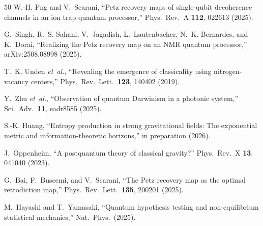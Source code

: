 \documentclass[prl,twocolumn,superscriptaddress,longbibliography,floatfix]{revtex4-2}
\begin{document}
\begin{thebibliography}{50}
W.-H. Png and V.~Scarani,
``Petz recovery maps of single-qubit decoherence channels in an
ion trap quantum processor,''
Phys.\ Rev.\ A \textbf{112}, 022613 (2025).

G.~Singh, R.~S. Sahani, V.~Jagadish, L.~Lautenbacher,
N.~K. Bernardes, and K.~Dorai,
``Realizing the Petz recovery map on an NMR quantum processor,''
arXiv:2508.08998 (2025).

T.~K. Unden \emph{et~al.},
``Revealing the emergence of classicality using nitrogen-vacancy
centers,''
Phys.\ Rev.\ Lett.\ \textbf{123}, 140402 (2019).

Y.~Zhu \emph{et~al.},
``Observation of quantum Darwinism in a photonic system,''
Sci.\ Adv.\ \textbf{11}, eadr8585 (2025).

S.-K. Huang,
``Entropy production in strong gravitational fields: The exponential
metric and information-theoretic horizons,''
in preparation (2026).

J.~Oppenheim,
``A postquantum theory of classical gravity?''
Phys.\ Rev.\ X \textbf{13}, 041040 (2023).

G.~Bai, F.~Buscemi, and V.~Scarani,
``The Petz recovery map as the optimal retrodiction map,''
Phys.\ Rev.\ Lett.\ \textbf{135}, 200201 (2025).

M.~Hayashi and T.~Yamasaki,
``Quantum hypothesis testing and non-equilibrium statistical mechanics,''
Nat.\ Phys.\ (2025).

\end{thebibliography}
\end{document}
